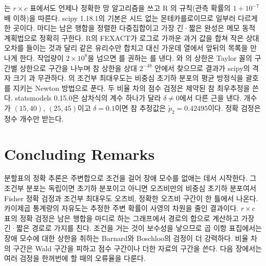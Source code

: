 \begin{instardust}
는 $r\times c$ 표에서도 언제나 정확한 망 알고리즘을 쓰고 R 의 규칙(관측 확률의 $1+10^{-7}$배 이하)을 따른다. scipy 1.18.1의 기본은 시드 없는 몬테카를로이므로 일부러 다르게 한 곳이다. 마디는 남은 행합을 정렬한 다중집합이고 가장 긴·짧은 완성은 메모 동적 계획법으로 정확히 구한다. R의 FEXACT가 로그로 가까운 과거 값을 합쳐 작은 상대오차를 들이는 것과 달리 같은 유리수만 합치고 대신 가운데 열에서 앞뒤의 목록을 만나게 한다. 작업량이 $2\times10^8$을 넘으면 를 권하는 를 낸다. 와 의 상한은 Taylor 꼴의 구간별 상한으로 구간을 나누며 참 상한을 상대 $2^{-48}$ 안에서 찾으므로 결과가 scipy의 격자 크기 과 무관하다. 의 조건부 최대우도는 비중심 초기하 분포의 평균 방정식을 괄호를 지키는 Newton 방법으로 푼다. 두 비율 차의 점수 검정은 제약된 참 최우추정을 쓴다. statsmodels 0.15.0은 삼차식의 계수 하나가 달라 $\delta\ne0$에서 다른 근을 낸다. 개수가 $(15,40)$, $(25,45)$이고 $\delta=0.1$이면 참 추정값은 $\tilde p_2=0.42495$이다. 정확 검정은 정수 개수만 받는다.
\end{instardust}

\section{Concluding Remarks}

분할표의 정확 추론은 주변합으로 조건을 걸어 장애 모수를 없애는 데서 시작한다. 그 조건부 분포는 독립이면 초기하 분포이고 아니면 오즈비만의 비중심 초기하 분포여서 Fisher 정확 검정과 조건부 최대우도 오즈비, 정확한 오즈비 구간이 한 틀에서 나온다. 카이제곱 통계량의 자유도는 추정한 주변 확률이 사영의 차원을 줄인 결과이다. $r\times c$ 표의 정확 검정은 남은 행합을 마디로 하는 그래프에서 경로의 합으로 계산하고 가장 긴·짧은 경로로 가지를 친다. 조건을 거는 것이 보수성을 낳으므로 곱 이항 표집에서는 장애 모수에 대한 상한을 취하는 Barnard와 Boschloo의 검정이 더 강력하다. 비율 차의 구간은 Wald 구간을 피하고 점수 구간이나 더한 자료의 구간을 쓴다. 다음 장에서는 여러 검정을 한꺼번에 할 때의 오류율을 다룬다.

\chapterreferences
